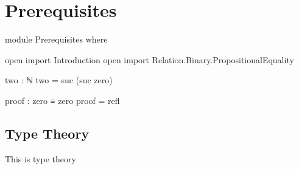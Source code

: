 \chapter{Prerequisites}

\begin{code}[hide]
module Prerequisites where

open import Introduction
open import Relation.Binary.PropositionalEquality
\end{code}

\begin{code}
two : ℕ
two = suc (suc zero)

proof : zero ≡ zero
proof = refl
\end{code}

\section{Type Theory}

This is type theory
